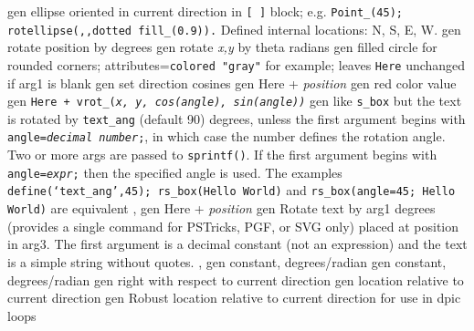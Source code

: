 %
  {gen}%
  {ellipse oriented in current direction in {\tt [ ]} block;
   e.g. {\tt Point\_(45); rotellipse(,{},dotted fill\_(0.9)).} Defined
   internal locations: N, S, E, W.}%
%
  {gen}%
  {rotate position by degrees}%
%
  {gen}%
  {rotate {\sl x,y} by theta radians}%
%
  {gen}%
  {filled circle for rounded corners; attributes={\tt colored "gray"}
   for example; leaves {\tt Here} unchanged if arg1 is blank
    }%
%
  {gen}%
  {set direction cosines}%
%
  {gen}%
  {Here + {\sl position}}%
%
  {gen}%
  {red color value}%
%
  {gen}%
  {\tt Here + vrot\_({\sl x, y, cos(angle), sin(angle))}}%
%
  {gen}%
  {like {\tt s\_box} but the text is rotated by {\tt text\_ang}%
   (default 90) degrees, unless
   the first argument begins with {\tt angle={\sl decimal number};},
   in which case the number defines the rotation angle.
   Two or more args are passed to {\tt sprintf()}.
   If the first argument begins with {\tt angle={\sl expr};} then
   the specified angle is used.
   The examples {\tt define(`text\_ang',45); rs\_box(Hello World)} and
   {\tt rs\_box(angle=45; Hello World)} are equivalent
   , }%
%
  {gen}%
  {Here + {\sl position}}%
%
  {gen}%
  {Rotate text by arg1 degrees (provides a single command for
   PSTricks, PGF, or SVG only) placed at position in arg3.
   The first argument is a decimal constant (not an expression) and
   the text is a simple string without quotes.
   , }%
%
  {gen}%
  {constant, degrees/radian}%
%
  {gen}%
  {constant, degrees/radian}%
%
  {gen}%
  {right with respect to current direction}%
%
  {gen}%
  {location relative to current direction}%
%
  {gen}%
  {Robust location relative to current direction for use in dpic loops}%

%

